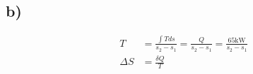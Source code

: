 

\subsection*{b)}
\begin{align*}
T &= \frac{\int T ds}{s_2 - s_1} = \frac{Q}{s_2 - s_1} = \frac{65 \text{kW}}{s_2 - s_1} \\
\Delta S &= \frac{\delta Q}{T}
\end{align*}